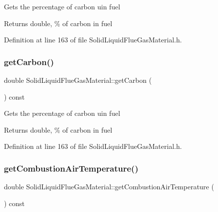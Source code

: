 Gets the percentage of carbon uin fuel \begin{DoxyReturn}{Returns}
double, \% of carbon in fuel 
\end{DoxyReturn}


Definition at line 163 of file Solid\+Liquid\+Flue\+Gas\+Material.\+h.

\mbox{\label{class_solid_liquid_flue_gas_material_a7b8a98111943d30094e2d6950f7f2ec1}} 
\subsubsection{\texorpdfstring{get\+Carbon()}{getCarbon()}\hspace{0.1cm}{\footnotesize\ttfamily [3/3]}}
{\footnotesize\ttfamily double Solid\+Liquid\+Flue\+Gas\+Material\+::get\+Carbon (\begin{DoxyParamCaption}{ }\end{DoxyParamCaption}) const\hspace{0.3cm}{\ttfamily [inline]}}

Gets the percentage of carbon uin fuel \begin{DoxyReturn}{Returns}
double, \% of carbon in fuel 
\end{DoxyReturn}


Definition at line 163 of file Solid\+Liquid\+Flue\+Gas\+Material.\+h.

\mbox{\label{class_solid_liquid_flue_gas_material_a8757b831e5a2ef26dbb0cf271c0e8207}} 
\subsubsection{\texorpdfstring{get\+Combustion\+Air\+Temperature()}{getCombustionAirTemperature()}\hspace{0.1cm}{\footnotesize\ttfamily [1/3]}}
{\footnotesize\ttfamily double Solid\+Liquid\+Flue\+Gas\+Material\+::get\+Combustion\+Air\+Temperature (\begin{DoxyParamCaption}{ }\end{DoxyParamCaption}) const\hspace{0.3cm}{\ttfamily [inline]}}


